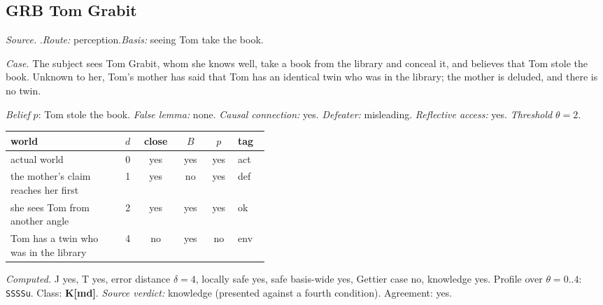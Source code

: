 \subsection*{GRB \enspace Tom Grabit}
\noindent\textit{Source.} \citet{LehrerPaxson1969}.\quad \textit{Route:} perception.\quad \textit{Basis:} seeing Tom take the book.\par
\noindent\textit{Case.} The subject sees Tom Grabit, whom she knows well, take a book from the library and conceal it, and believes that Tom stole the book. Unknown to her, Tom's mother has said that Tom has an identical twin who was in the library; the mother is deluded, and there is no twin.\par
\noindent\textit{Belief} $p$: Tom stole the book.
 \textit{False lemma:} none. \textit{Causal connection:} yes. \textit{Defeater:} misleading. \textit{Reflective access:} yes. \textit{Threshold} $\theta = 2$.\par
\begin{center}\begin{tabular}{@{}p{0.43\linewidth}rcccl@{}}
world & $d$ & close & $B$ & $p$ & tag \\ \midrule
actual world & 0 & yes & yes & yes & act \\
the mother's claim reaches her first & 1 & yes & no & yes & def \\
she sees Tom from another angle & 2 & yes & yes & yes & ok \\
Tom has a twin who was in the library & 4 & no & yes & no & env \\
\end{tabular}\end{center}
\noindent\textit{Computed.} J yes, T yes, error distance $\delta = 4$, locally safe yes, safe basis-wide yes, Gettier case no, knowledge yes. Profile over $\theta = 0..4$: \texttt{SSSSu}. Class: \textbf{K[md]}.
 \textit{Source verdict:} knowledge (presented against a fourth condition). Agreement: yes.
\par\medskip
{}

